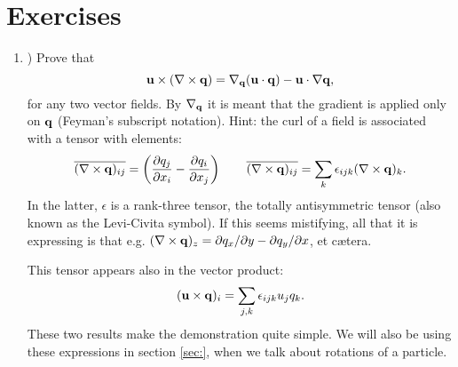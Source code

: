 
\section{Exercises}

\begin{enumerate}
\item \label{ex:vector_identity}) Prove that
\[
\mathbf{u} \times ( \nabla\times \mathbf{q}) =
\nabla_{\mathbf{q}} (\mathbf{u}\cdot\mathbf{q}) - \mathbf{u} \cdot \nabla \mathbf{q} ,
\]
for any two vector fields. By $\nabla_{\mathbf{q}} $ it is meant that the
gradient is applied only on $\mathbf{q}$ (Feyman's subscript notation).
Hint: the curl of a field is associated with a tensor with elements:
\[
\overline{( \nabla\times\mathbf{q} )_{ij}} =
\left(
\frac{\partial q_j}{\partial x_i} -
\frac{\partial q_i}{\partial x_j}
\right) \qquad
\overline{( \nabla\times\mathbf{q} )_{ij}} =
\sum_k \epsilon_{ijk}  ( \nabla\times\mathbf{q} )_k .
\]
In the latter, $\epsilon$ is a rank-three tensor, the totally
antisymmetric tensor (also known as the Levi-Civita symbol).  If this
seems mistifying, all that it is expressing is that e.g.  $
(\nabla\times\mathbf{q})_z= \partial q_x /\partial y - \partial q_y
/\partial x$, et c\ae tera.

This tensor appears also in the vector product:
\[
(\mathbf{u}\times\mathbf{q})_i= \sum_{j,k} \epsilon_{ijk} u_j q_k .
\]
These two results make the demonstration quite simple. We will
also be using these expressions in section \ref{sec:}, when
we talk about rotations of a particle.

\end{enumerate}
